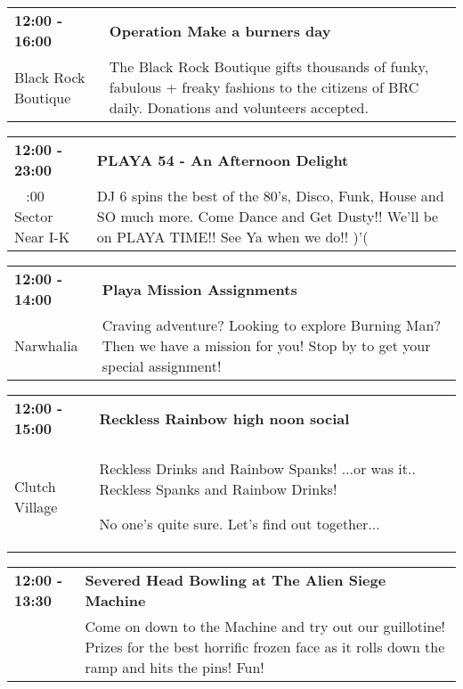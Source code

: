 \begin{tabular}{ p{1in} p{2.2in} }
    \textbf{12:00 - 16:00} & \textbf{Operation Make a burners day} \\
    Black Rock Boutique \newline  & The Black Rock Boutique gifts thousands of funky, fabulous + freaky fashions to the citizens of BRC daily.  Donations and volunteers accepted. \\
    \hline 
\end{tabular}
    
\begin{tabular}{ p{1in} p{2.2in} }
    \textbf{12:00 - 23:00} & \textbf{PLAYA 54 - An Afternoon Delight} \\
    ~ \newline 9:00 Sector Near I-K & DJ 6 spins the best of the 80's, Disco, Funk, House and SO much more. Come Dance and Get Dusty!! We'll be on PLAYA TIME!! See Ya when we do!! )'( \\
    \hline 
\end{tabular}
    
\begin{tabular}{ p{1in} p{2.2in} }
    \textbf{12:00 - 14:00} & \textbf{Playa Mission Assignments} \\
    Narwhalia \newline  & Craving adventure? Looking to explore Burning Man? Then we have a mission for you! Stop by to get your special assignment! \\
    \hline 
\end{tabular}
    
\begin{tabular}{ p{1in} p{2.2in} }
    \textbf{12:00 - 15:00} & \textbf{Reckless Rainbow high noon social} \\
    Clutch Village \newline  & Reckless Drinks and Rainbow Spanks!
...or was it.. Reckless Spanks and Rainbow Drinks!

No one's quite sure. Let's find out together... \\
    \hline 
\end{tabular}
    
\begin{tabular}{ p{1in} p{2.2in} }
    \textbf{12:00 - 13:30} & \textbf{Severed Head Bowling at The Alien Siege Machine} \\
    ~ \newline  & Come on down to the Machine and try out our guillotine!  Prizes for the best horrific frozen face as it rolls down the ramp and hits the pins! Fun! \\
    \hline 
\end{tabular}
    
